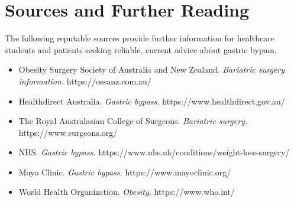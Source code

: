 \section*{Sources and Further Reading}
The following reputable sources provide further information for healthcare students and patients seeking reliable, current advice about gastric bypass.
\begin{itemize}
    \item Obesity Surgery Society of Australia and New Zealand. \textit{Bariatric surgery information.} https://ossanz.com.au/
    \item Healthdirect Australia. \textit{Gastric bypass.} https://www.healthdirect.gov.au/
    \item The Royal Australasian College of Surgeons. \textit{Bariatric surgery.} https://www.surgeons.org/
    \item NHS. \textit{Gastric bypass.} https://www.nhs.uk/conditions/weight-loss-surgery/
    \item Mayo Clinic. \textit{Gastric bypass.} https://www.mayoclinic.org/
    \item World Health Organization. \textit{Obesity.} https://www.who.int/
\end{itemize}
